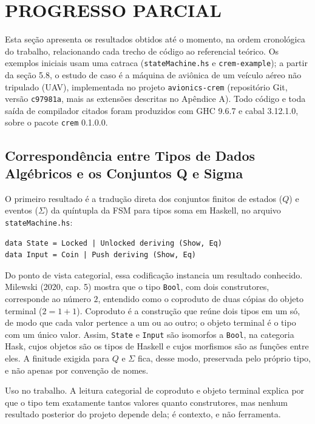 \documentclass[12pt,a4paper]{article}
\begin{document}
\section{PROGRESSO PARCIAL}

Esta seção apresenta os resultados obtidos até o momento, na ordem cronológica do trabalho, relacionando cada trecho de código ao referencial teórico. Os exemplos iniciais usam uma catraca (\texttt{stateMachine.hs} e \texttt{crem-example}); a partir da seção 5.8, o estudo de caso é a máquina de aviônica de um veículo aéreo não tripulado (UAV), implementada no projeto \texttt{avionics-crem} (repositório Git, versão \texttt{c97981a}, mais as extensões descritas no Apêndice A). Todo código e toda saída de compilador citados foram produzidos com GHC 9.6.7 e cabal 3.12.1.0, sobre o pacote \texttt{crem} 0.1.0.0.

\subsection{Correspondência entre Tipos de Dados Algébricos e os Conjuntos Q e Sigma}

O primeiro resultado é a tradução direta dos conjuntos finitos de estados ($Q$) e eventos ($\Sigma$) da quíntupla da FSM para tipos soma em Haskell, no arquivo \texttt{stateMachine.hs}:

\begin{verbatim}
data State = Locked | Unlocked deriving (Show, Eq)
data Input = Coin | Push deriving (Show, Eq)
\end{verbatim}

Do ponto de vista categorial, essa codificação instancia um resultado conhecido. Milewski (2020, cap. 5) mostra que o tipo \texttt{Bool}, com dois construtores, corresponde ao número $2$, entendido como o coproduto de duas cópias do objeto terminal ($2 = 1 + 1$). Coproduto é a construção que reúne dois tipos em um só, de modo que cada valor pertence a um ou ao outro; o objeto terminal é o tipo com um único valor. Assim, \texttt{State} e \texttt{Input} são isomorfos a \texttt{Bool}, na categoria Hask, cujos objetos são os tipos de Haskell e cujos morfismos são as funções entre eles. A finitude exigida para $Q$ e $\Sigma$ fica, desse modo, preservada pelo próprio tipo, e não apenas por convenção de nomes.

Uso no trabalho. A leitura categorial de coproduto e objeto terminal explica por que o tipo tem exatamente tantos valores quanto construtores, mas nenhum resultado posterior do projeto depende dela; é contexto, e não ferramenta.
\end{document}
